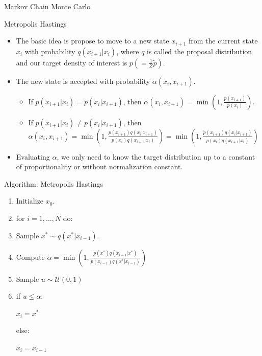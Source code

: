 \documentclass{beamer}
\begin{document}
\begin{section}{Markov Chain Monte Carlo}
    \begin{frame}{Metropolis Hastings}
        \begin{itemize}
            \item The basic idea is propose to move to a new state $x_{i+1}$ from the current state $x_i$ with probability $q(x_{i+1}|x_i)$, where $q$ is called the proposal distribution and our target density of interest is $p (= \frac{1}{Z} \tilde{p})$.
            \item The new state is accepted with probability $\alpha(x_i, x_{i+1})$.
            \begin{itemize}
                \item If $p(x_{i+1}| x_i) = p(x_i| x_{i+1})$, then $\alpha(x_i, x_{i+1}) = \min (1, \frac{p(x_{i+1})}{p(x_i)})$.
                \item If $p(x_{i+1}| x_i) \neq p(x_i| x_{i+1})$, then $\alpha(x_i, x_{i+1}) = \min (1, \frac{p(x_{i+1})q(x_i|x_{i+1})}{p(x_i)q(x_{i+1}|x_i)}) = \min (1, \frac{\tilde{p}(x_{i+1})q(x_i|x_{i+1})}{\tilde{p}(x_i)q(x_{i+1}|x_i)})$
            \end{itemize}
            \item Evaluating $\alpha$, we only need to know the target distribution up to a constant of proportionality or without normalization constant.
        \end{itemize}
    \end{frame}

    \begin{frame}{Algorithm: Metropolis Hastings}
        \begin{enumerate}
            \item Initialize $x_0$.
            \item for $i = 1, \ldots, N$ do:
            \item \quad Sample $x^* \sim q(x^*|x_{i-1})$.
            \item \quad Compute $\alpha = \min (1, \frac{\tilde{p}(x^*)q(x_{i-1}|x^*)}{\tilde{p}(x_{i-1})q(x^*|x_{i-1})})$
            \item \quad Sample $u \sim \mathcal{U}(0, 1)$
            \item \quad if $u \leq \alpha$:
            
            \quad \quad $x_i = x^*$
            
            \quad else:
            
            \quad \quad $x_i = x_{i-1}$
        \end{enumerate}
    \end{frame}


\end{section}
\end{document}
